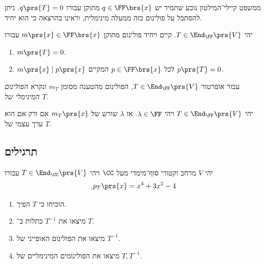 \documentclass[a4paper,10pt,twoside,openany]{book}
\begin{document}
ממשפט קיילי־המילטון נובע שתמיד יש
$q \in \FF\brs{x}$
מתוקן עבורו
$q\prs{T} = 0$.
ניתן להסתכל על פולינום כזה ממעלה מינימלית, וראינו בהרצאה כי הוא יחיד.

\begin{proposition} \label{proposition:min-pol}
יהי
$T \in \End_\FF\prs{V}$.
קיים ויחיד פולינום מתוקן
$m\prs{x} \in \FF\brs{x}$
עבורו
\begin{enumerate}
\item $m\prs{T} = 0$.
\item $m\prs{x} \mid p\prs{x}$
לכל
$p \in \FF\brs{x}$
המקיים
$p\prs{T} = 0$.
\end{enumerate}
\end{proposition}

\begin{definition}
עבור אופרטור
$T \in \End_\FF\prs{V}$,
הפולינום מהטענה מסומן
$m_T$
ונקרא
\emph{הפולינום המינימלי של
$T$}.
\end{definition}

\begin{proposition}\label{proposition:min-pol-roots}
יהי
$T \in \End_\FF\prs{V}$
ויהי
$\lambda \in \FF$.
אז
$\lambda$
שורש של
$m_T\prs{x}$
אם ורק אם הוא ערך עצמי של
$T$.
\end{proposition}

\subsection{תרגילים}

\begin{exercisechap}
יהי
$V$
מרחב וקטורי סוף־מימדי מעל
$\CC$
ויהי
$T \in \End_\CC\prs{V}$
עבורו
\begin{align*}
\text{.} p_T\prs{x} = x^4 + 3x^2 - 4
\end{align*}

\begin{enumerate}
\item הוכיחו כי
$T$
הפיך.

\item מיצאו את
$T^{-1}$
כתלות ב־%
$T$.

\item מיצאו את הפולינום האופייני של
$T^{-1}$.

\item מיצאו את הפולינומים המינימליים של
$T, T^{-1}$. 
\end{enumerate}
\end{exercisechap}
\end{document}

